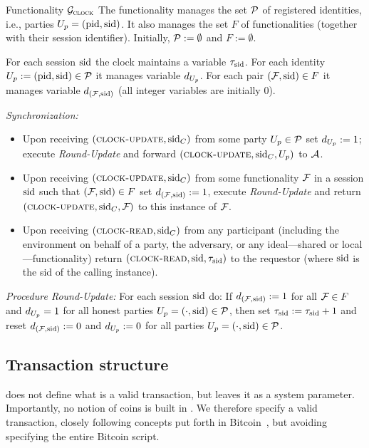   \begin{systembox}{Functionality $\mathcal{G}_{\textsc{clock}}$}
    The functionality manages the set $\mathcal{P}$ of registered identities, i.e.,
    parties ${U_p} = (\text{pid},\text{sid})$. It also manages the set $F$ of
    functionalities (together with their session identifier). Initially,
    $\mathcal{P}:=\emptyset$ and $F := \emptyset$.

    \smallskip
    For each session $\text{sid}$ the clock maintains a variable $\tau_{\text{sid}}$. For
    each identity ${U_p} := (\text{pid},\text{sid}) \in \mathcal{P}$ it manages variable
    $d_{U_p}$. For each pair $(\mathcal{F}_{\textsc{\relax}},\text{sid}) \in F$ it manages variable
    $d_{(\mathcal{F}_{\textsc{\relax}},\text{sid})}$ (all integer variables are initially $0$).

    \medskip

    \emph{Synchronization:}
    \begin{itemize}
      \item Upon receiving $(\textsc{clock-update}, \text{sid}_C)$ from some party ${U_p} \in
      \mathcal{P}$ set $d_{{U_p}}:=1$; execute \emph{Round-Update} and forward
      $(\textsc{clock-update}, \text{sid}_C, {U_p})$  to $\mathcal{A}_{\relax}$.

      \item Upon receiving $(\textsc{clock-update}, \text{sid}_C)$ from some functionality
      $\mathcal{F}_{\textsc{\relax}}$ in a session $\text{sid}$ such that $(\mathcal{F}_{\textsc{\relax}},\text{sid}) \in F$ set
      $d_{(\mathcal{F}_{\textsc{\relax}},\text{sid})}:=1$, execute \emph{Round-Update} and return $(\textsc{clock-update},
      \text{sid}_C,\mathcal{F}_{\textsc{\relax}})$ to this instance of $\mathcal{F}_{\textsc{\relax}}$.

      \item Upon receiving $(\textsc{clock-read}, \text{sid}_C)$ from any participant
      (including the environment on behalf of a party, the adversary, or any
      ideal---shared or local---functionality) return $(\textsc{clock-read},
      \text{sid},\tau_{\text{sid}})$ to the requestor (where $\text{sid}$ is the sid of the
      calling instance).
    \end{itemize}

    \emph{Procedure Round-Update:}
    For each session $\text{sid}$ do:
    If $d_{(\mathcal{F}_{\textsc{\relax}},\text{sid})}:=1$ for all $\mathcal{F}_{\textsc{\relax}} \in F$ and $d_{{U_p}}=1$ for all
    honest parties ${U_p}=(\cdot,\text{sid}) \in \mathcal{P}$, then set
    $\tau_{\text{sid}}:=\tau_{\text{sid}}+1$  and reset $d_{(\mathcal{F}_{\textsc{\relax}},\text{sid})}:=0$ and
    $d_{{U_p}}:=0$ for all parties ${U_p}=(\cdot,\text{sid}) \in \mathcal{P}$.
  \end{systembox}

  \subsection{Transaction structure}
    \ledger{} does not define what is a valid transaction, but leaves it as a
    system parameter. Importantly, no notion of coins is built in \ledger. We
    therefore specify a valid transaction, closely following concepts put forth
    in Bitcoin~\cite{bitcoin}, but avoiding specifying the entire Bitcoin
    script.

